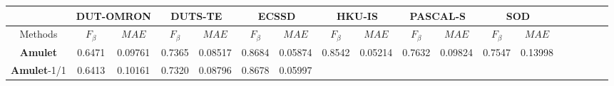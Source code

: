 \documentclass[10pt,twocolumn,letterpaper]{article}
\begin{document}
\begin{table}
\vspace{-5mm}
\begin{center}
\doublerulesep=0.6pt
\begin{tabular}{|c|c|c|c|c|c|c|c|c|c|c|c|c|c|c|c|c|c|c|c|c|c|c|c|c|||c|c|c|c|c|c|c|c|||}
\hline
\multicolumn{4}{|c|}{}
&\multicolumn{4}{|c|}{DUT-OMRON}
&\multicolumn{4}{|c|}{DUTS-TE}
&\multicolumn{4}{|c|}{ECSSD}
&\multicolumn{4}{|c|}{HKU-IS}
&\multicolumn{4}{|c|}{PASCAL-S}
&\multicolumn{4}{|c|}{SOD}
\\
\hline
\multicolumn{4}{|c|}{Methods}
&\multicolumn{2}{|c|}{$F_\beta$}&\multicolumn{2}{|c|}{$MAE$}%
&\multicolumn{2}{|c|}{$F_\beta$}&\multicolumn{2}{|c|}{$MAE$}%
&\multicolumn{2}{|c|}{$F_\beta$}&\multicolumn{2}{|c|}{$MAE$}%
&\multicolumn{2}{|c|}{$F_\beta$}&\multicolumn{2}{|c|}{$MAE$}%
&\multicolumn{2}{|c|}{$F_\beta$}&\multicolumn{2}{|c|}{$MAE$}%
&\multicolumn{2}{|c|}{$F_\beta$}&\multicolumn{2}{|c|}{$MAE$}%
\\
\hline
\multicolumn{4}{|c|}{\textbf{Amulet}}
&\multicolumn{2}{|c|}{\textcolor[rgb]{0,1,0}{0.6471}}&\multicolumn{2}{|c|}{\textcolor[rgb]{0,0,1}{0.09761}}%
&\multicolumn{2}{|c|}{\textcolor[rgb]{1,0,0}{0.7365}}&\multicolumn{2}{|c|}{\textcolor[rgb]{0,1,0}{0.08517}}%
&\multicolumn{2}{|c|}{\textcolor[rgb]{1,0,0}{0.8684}}&\multicolumn{2}{|c|}{\textcolor[rgb]{1,0,0}{0.05874}}%
&\multicolumn{2}{|c|}{\textcolor[rgb]{1,0,0}{0.8542}}&\multicolumn{2}{|c|}{\textcolor[rgb]{1,0,0}{0.05214}}%
&\multicolumn{2}{|c|}{\textcolor[rgb]{0,0,1}{0.7632}}&\multicolumn{2}{|c|}{\textcolor[rgb]{0,1,0}{0.09824}}%
&\multicolumn{2}{|c|}{\textcolor[rgb]{0,1,0}{0.7547}}&\multicolumn{2}{|c|}{\textcolor[rgb]{0,1,0}{0.13998}}%
\\
\multicolumn{4}{|c|}{\textbf{Amulet}-1/1}
&\multicolumn{2}{|c|}{0.6413}&\multicolumn{2}{|c|}{0.10161}%
&\multicolumn{2}{|c|}{\textcolor[rgb]{0,0,1}{0.7320}}&\multicolumn{2}{|c|}{\textcolor[rgb]{0,0,1}{0.08796}}%
&\multicolumn{2}{|c|}{\textcolor[rgb]{0,1,0}{0.8678}}&\multicolumn{2}{|c|}{\textcolor[rgb]{0,0,1}{0.05997}}%

\end{tabular}
\end{center}
\end{table}
\end{document}
